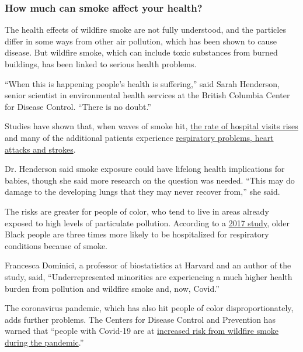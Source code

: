 \hypertarget{how-much-can-smoke-affect-your-health}{%
\subsubsection{How much can smoke affect your
health?}\label{how-much-can-smoke-affect-your-health}}

The health effects of wildfire smoke are not fully understood, and the
particles differ in some ways from other air pollution, which has been
shown to cause disease. But wildfire smoke, which can include toxic
substances from burned buildings, has been linked to serious health
problems.

``When this is happening people's health is suffering,'' said Sarah
Henderson, senior scientist in environmental health services at the
British Columbia Center for Disease Control. ``There is no doubt.''

Studies have shown that, when waves of smoke hit,
\href{https://insights.ovid.com/epidemiology/epide/2017/01/000/wildfire-specific-fine-particulate-matter-risk/13/00001648}{the
rate of hospital visits rises} and many of the additional patients
experience
\href{https://www.ncbi.nlm.nih.gov/pmc/articles/PMC6015400/}{respiratory
problems, heart attacks and strokes}.

Dr. Henderson said smoke exposure could have lifelong health
implications for babies, though she said more research on the question
was needed. ``This may do damage to the developing lungs that they may
never recover from,'' she said.

The risks are greater for people of color, who tend to live in areas
already exposed to high levels of particulate pollution. According to a
\href{https://academic.oup.com/aje/article/186/6/730/3836014}{2017
study}, older Black people are three times more likely to be
hospitalized for respiratory conditions because of smoke.

Francesca Dominici, a professor of biostatistics at Harvard and an
author of the study, said, ``Underrepresented minorities are
experiencing a much higher health burden from pollution and wildfire
smoke and, now, Covid.''

The coronavirus pandemic, which has also hit people of color
disproportionately, adds further problems. The Centers for Disease
Control and Prevention has warned that ``people with Covid-19 are at
\href{https://www.cdc.gov/disasters/covid-19/wildfire_smoke_covid-19.html}{increased
risk from wildfire smoke during the pandemic}.''

